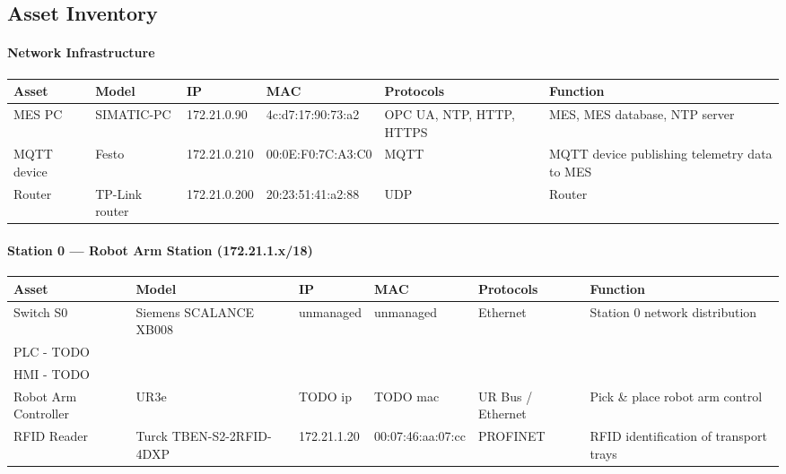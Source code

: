 \documentclass[11pt,a4paper]{article}
\begin{document}
\subsection{Asset Inventory}
{\scriptsize
\setlength{\tabcolsep}{3pt}

\paragraph{Network Infrastructure}
\begin{longtable}{L{2cm} L{2.1cm} L{2.1cm} L{2.6cm} L{2.4cm} L{4cm}}
\toprule
\textbf{Asset} & \textbf{Model} & \textbf{IP} & \textbf{MAC} & \textbf{Protocols} & \textbf{Function} \\
\midrule \endhead
    MES PC & SIMATIC-PC & 172.21.0.90 & 4c:d7:17:90:73:a2 & OPC
    UA, NTP, HTTP, HTTPS & MES, MES database, NTP server \\

    MQTT device & Festo & 172.21.0.210 & 00:0E:F0:7C:A3:C0 &
    MQTT & MQTT device publishing telemetry data to MES \\

    Router & TP-Link router & 172.21.0.200 &
    20:23:51:41:a2:88 & UDP & Router \\
\bottomrule
\end{longtable}

\paragraph{Station 0 --- Robot Arm Station (172.21.1.x/18)}
\begin{longtable}{L{2cm} L{2.1cm} L{2.1cm} L{2.6cm} L{2.4cm} L{4cm}}
\toprule
\textbf{Asset} & \textbf{Model} & \textbf{IP} & \textbf{MAC} & \textbf{Protocols} & \textbf{Function} \\
\midrule \endhead
    Switch S0 & Siemens SCALANCE XB008 & unmanaged & unmanaged &
    Ethernet & Station 0 network distribution \\

    PLC  - TODO\\

    HMI  - TODO\\

    Robot Arm Controller & UR3e & TODO ip & TODO mac & UR Bus / Ethernet & Pick \& place robot arm control \\ 

    RFID Reader & Turck TBEN-S2-2RFID-4DXP & 172.21.1.20 &
    00:07:46:aa:07:cc & PROFINET & RFID identification of transport trays \\
\bottomrule
\end{longtable}


}
\end{document}
